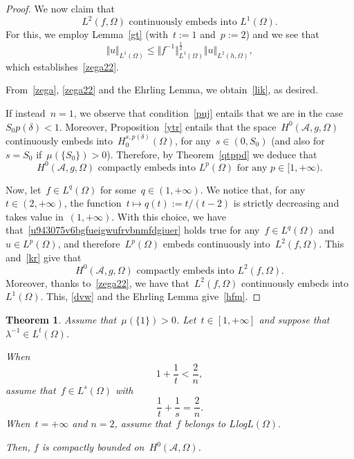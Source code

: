 \documentclass[11pt,hyp,]{nyjm}
\numberwithin{equation}{section}
\newtheorem{theorem}{Theorem}[section]
\theoremstyle{remark}
\renewcommand{\leq}{\leqslant}
\begin{document}
\begin{proof}
We now claim that
\begin{equation}\label{zega22}
{\mbox{$L^{2}(f,\Omega)$ continuously embeds into~$L^{1}(\Omega)$.}}
\end{equation}
For this, we employ Lemma~\ref{gt} (with~$t:=1$ and~$p:=2$) and we see that
\[ \Vert u \Vert_{L^{1}(\Omega)} \leq  \Vert f^{-1} \Vert^{\frac{1}{2}}_{L^1(\Omega)}  \Vert u \Vert_{L^2(h,\Omega)},\]
which establishes~\eqref{zega22}.

{F}rom~\eqref{zega}, \eqref{zega22} and the Ehrling Lemma, we obtain~\eqref{lik},
as desired.

If instead~$n=1$, we observe that condition~\eqref{puj} entails that we are in the case~$S_0p(\delta)<1$.
Moreover, Proposition~\ref{ytr} entails that the space~$H^0(\mathcal{A}, g, \Omega)$ continuously embeds into~$H_0^{s, p(\delta)}(\Omega)$, for any~$s \in(0,S_0)$ (and also for~$s=S_0$ if~$\mu(\{S_0\})>0$). Therefore, by Theorem~\ref{qtppd} we deduce that
\begin{equation}\label{kr}
{\mbox{$H^0(\mathcal{A}, g, \Omega) $ compactly embeds into~$L^{p}(\Omega)$  for any~$p \in [1,+\infty)$.}}
\end{equation}

{N}ow, let~$f \in L^q(\Omega)$ for some~$q\in (1, +\infty)$.
We notice that, for any~$t \in (2, +\infty)$, the function~$t \mapsto q(t):=t/(t-2)$ is strictly decreasing and takes value in~$\left(1, +\infty\right)$. With this choice, we have that~\eqref{u943075v6bgfueigwufrvbnmfdgiuer} holds true for any~$f\in L^q(\Omega)$ and~$u\in L^p(\Omega)$, and therefore~$L^p(\Omega)$ embeds continuously into~$L^2(f,\Omega)$.
This and~\eqref{kr} give that
\begin{equation}\label{dvw}
{\mbox{$H^0(\mathcal{A}, g, \Omega)$ compactly embeds into~$L^{2}(f,\Omega)$.}}
\end{equation}
Moreover, thanks to~\eqref{zega22}, we have that~$L^{2}(f,\Omega)$ continuously embeds into~$L^{1}(\Omega)$.
This, \eqref{dvw} and the Ehrling Lemma give~\eqref{hfm}.
\end{proof}

\begin{theorem}\label{zega2}
Assume that~$\mu(\{1\})>0$. 
Let~$t\in[1,+\infty]$ and suppose that~$\lambda^{-1} \in L^t(\Omega)$. 

When
\[ 1 + \frac{1}{t} < \frac{2}{n}, \] 
assume that~$f \in L^s(\Omega)$ with 
\[ \frac{1}{t} + \frac{1}{s} = \frac{2}{n}. \]
When~$t= +\infty$ and $n=2$, assume that~$f$ belongs to $L$log$L(\Omega)$.

Then, $f$ is compactly bounded on~$H^0(\mathcal{A}, \Omega)$.
\end{theorem}
\end{document}

